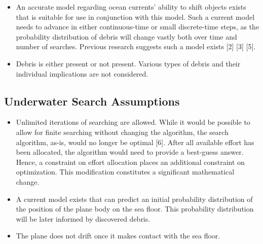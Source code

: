 \begin{itemize}
\item An accurate model regarding ocean currents' ability to shift objects exists that is suitable for use in conjunction with this model. Such a current model needs to advance in either continuous-time or small discrete-time steps, as the probability distribution of debris will change vastly both over time and number of searches. Previous research suggests such a model exists [2] [3] [5]. 
\item Debris is either present or not present. Various types of debris and their individual implications are not considered. 
\end{itemize}

\subsection{Underwater Search Assumptions}

\begin{itemize}
\item Unlimited iterations of searching are allowed. While it would be possible to allow for finite searching without changing the algorithm, the search algorithm, as-is, would no longer be optimal [6]. 
After all available effort has been allocated, the algorithm would need to provide a best-guess answer. Hence, a constraint on effort allocation places an additional constraint on optimization. This modification constitutes a significant mathematical change.
\item A current model exists that can predict an initial probability distribution of the position of the plane body on the sea floor. This probability distribution will be later informed by discovered debris.
\item The plane does not drift once it makes contact with the sea floor. 
\end{itemize}